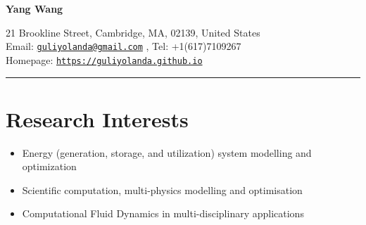 \documentclass[letterpaper]{article}
\def\name{Yang Wang}
\begin{document}

\centerline{\LARGE \bf \name}


\begin{minipage}{\linewidth}
\begin{center}
21 Brookline Street, Cambridge, MA, 02139, United States\\
Email: \href{mailto:guliyolanda@gmail.com}{\tt guliyolanda@gmail.com} , Tel: +1(617)7109267 \\
Homepage:  \href{https://guliyolanda.github.io}{\tt https://guliyolanda.github.io} \\
\end{center}
\end{minipage}

\vspace{0pt}
\rule{\textwidth}{1pt}

\vspace{-12pt}
\section*{Research Interests}
\vspace{-10pt}
\begin{itemize}
\item Energy (generation, storage, and utilization) system modelling and optimization
\item Scientific computation, multi-physics modelling and optimisation
\item Computational Fluid Dynamics in multi-disciplinary applications

\end{itemize}

\vspace{-12pt}
\end{document}
